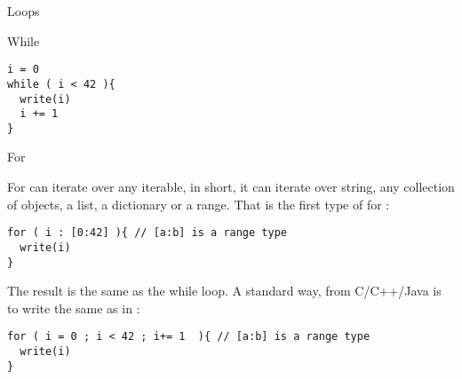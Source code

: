 \begin{section}{Loops}

\begin{subsection}{While}

\begin{lstlisting}[style=JexlStyle]
i = 0 
while ( i < 42 ){
  write(i)
  i += 1
}
\end{lstlisting}

\end{subsection}

\begin{subsection}{For}

For can iterate over any iterable, 
in short, it can iterate over string, any collection of objects,
a list, a dictionary or a range.
That is the first type of for :
\begin{lstlisting}[style=JexlStyle]
for ( i : [0:42] ){ // [a:b] is a range type 
  write(i)
}
\end{lstlisting}
The result is the same as the while loop.
A standard way, from C/C++/Java is to write the same as in :
\begin{lstlisting}[style=JexlStyle]
for ( i = 0 ; i < 42 ; i+= 1  ){ // [a:b] is a range type 
  write(i)
}
\end{lstlisting}
\end{subsection}
\end{section}

